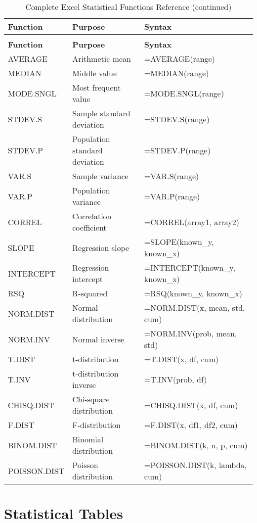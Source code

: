 \documentclass[12pt,a4paper]{book}
\begin{document}
{{\begin{longtable}{@{}lll@{}}
\caption{Complete Excel Statistical Functions Reference} \\
\toprule
\textbf{Function} & \textbf{Purpose} & \textbf{Syntax} \\
\midrule
\endfirsthead
\caption[]{Complete Excel Statistical Functions Reference (continued)} \\
\toprule
\textbf{Function} & \textbf{Purpose} & \textbf{Syntax} \\
\midrule
\endhead
\bottomrule
\endfoot
\bottomrule
\endlastfoot
AVERAGE & Arithmetic mean & =AVERAGE(range) \\
MEDIAN & Middle value & =MEDIAN(range) \\
MODE.SNGL & Most frequent value & =MODE.SNGL(range) \\
STDEV.S & Sample standard deviation & =STDEV.S(range) \\
STDEV.P & Population standard deviation & =STDEV.P(range) \\
VAR.S & Sample variance & =VAR.S(range) \\
VAR.P & Population variance & =VAR.P(range) \\
CORREL & Correlation coefficient & =CORREL(array1, array2) \\
SLOPE & Regression slope & =SLOPE(known\_y, known\_x) \\
INTERCEPT & Regression intercept & =INTERCEPT(known\_y, known\_x) \\
RSQ & R-squared & =RSQ(known\_y, known\_x) \\
NORM.DIST & Normal distribution & =NORM.DIST(x, mean, std, cum) \\
NORM.INV & Normal inverse & =NORM.INV(prob, mean, std) \\
T.DIST & t-distribution & =T.DIST(x, df, cum) \\
T.INV & t-distribution inverse & =T.INV(prob, df) \\
CHISQ.DIST & Chi-square distribution & =CHISQ.DIST(x, df, cum) \\
F.DIST & F-distribution & =F.DIST(x, df1, df2, cum) \\
BINOM.DIST & Binomial distribution & =BINOM.DIST(k, n, p, cum) \\
POISSON.DIST & Poisson distribution & =POISSON.DIST(k, lambda, cum) \\
\end{longtable}

\chapter{Statistical Tables}

}}
\end{document}
